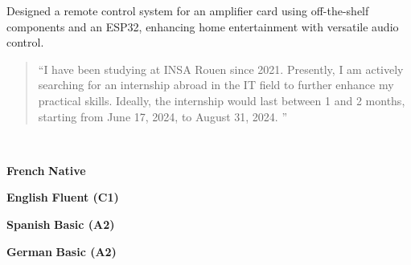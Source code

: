 \documentclass[10pt,a4paper,ragged2e,withhyper]{./AltaCV/altacv}
\begin{document}
\begin{paracol}{2}
  \divider

  {}
  {}
  {}
  Designed a remote control system for an amplifier card using off-the-shelf components and an ESP32, enhancing home entertainment with versatile audio control.
 
  \medskip

  \switchcolumn


  \begin{quote}
    ``I have been studying at INSA Rouen since 2021.
    Presently, I am actively searching for an internship abroad in the IT field to further enhance my practical skills.
    Ideally, the internship would last between 1 and 2 months, starting from June 17, 2024, to August 31, 2024.
    ''
  \end{quote}



  \divider


  \divider



  \\

  \divider

  \cvtag{\LaTeX}


  \textcolor{emphasis}{\textbf{French}} \hfill \textbf{Native}\\

  \divider

  \textcolor{emphasis}{\textbf{English}} \hfill \textbf{Fluent (C1)}\\

  \divider

  \textcolor{emphasis}{\textbf{Spanish}} \hfill \textbf{Basic (A2)}\\

  \divider

  \textcolor{emphasis}{\textbf{German}} \hfill \textbf{Basic (A2)}\\

\end{paracol}
\end{document}
